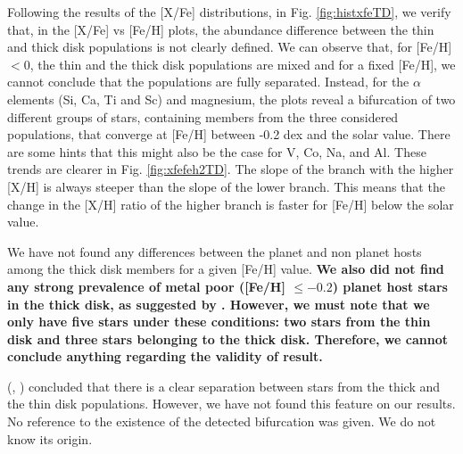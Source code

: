 \documentclass[oldversion]{aa}
\begin{document}
Following the results of the [X/Fe] distributions, in Fig. \ref{fig:histxfeTD}, we verify that, in the [X/Fe] vs [Fe/H] plots, the abundance difference between the thin and thick disk populations is not clearly defined. We can observe that, for [Fe/H] $<0$, the thin and the thick disk populations are mixed and for a fixed [Fe/H], we cannot conclude that the populations are fully separated. Instead, for the $\alpha$ elements (Si, Ca, Ti and Sc) and magnesium, the plots reveal a bifurcation of two different groups of stars, containing members from the three considered populations, that converge at [Fe/H] between -0.2 dex and the solar value. There are some hints that this might also be the case for V, Co, Na, and Al. %
These trends are clearer in Fig. \ref{fig:xfefeh2TD}. The slope of the branch with the higher [X/H] is always steeper than the slope of the lower branch. This means that the change in the [X/H] ratio of the higher branch is faster for [Fe/H] below the solar value. %

We have not found any differences between the planet and non planet hosts among the thick disk members for a given [Fe/H] value. \textbf{We also did not find any strong prevalence of metal poor ([Fe/H] $\leqslant-0.2$) planet host stars in the thick disk, as suggested by \citet{Haywood-2008}. However, we must note that we only have five stars under these conditions: two stars from the thin disk and three stars belonging to the thick disk. Therefore, we cannot conclude anything regarding the validity of \citet{Haywood-2008} result.}

\citeauthor{Bensby-2003} (\citeyear{Bensby-2003}, \citeyear{Bensby-2005}) concluded that there is a clear separation between stars from the thick and the thin disk populations. However, we have not found this feature on our results. %
No reference to the existence of the detected bifurcation was given. We do not know its origin. %

\end{document}
